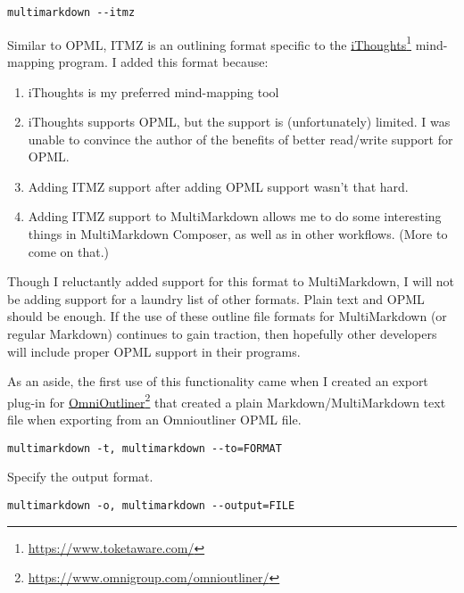 \begin{verbatim}
multimarkdown --itmz
\end{verbatim}

Similar to OPML, ITMZ is an outlining format specific to the \href{https://www.toketaware.com/}{iThoughts}\footnote{\href{https://www.toketaware.com/}{https:\slash{}\slash{}www.toketaware.com\slash{}}} mind-mapping program. I added this format because:

\begin{enumerate}
\item iThoughts is my preferred mind-mapping tool

\item iThoughts supports OPML, but the support is (unfortunately) limited. I was unable to convince the author of the benefits of better read\slash{}write support for OPML.

\item Adding ITMZ support after adding OPML support wasn't that hard.

\item Adding ITMZ support to MultiMarkdown allows me to do some interesting things in MultiMarkdown Composer, as well as in other workflows. (More to come on that.)

\end{enumerate}

Though I reluctantly added support for this format to MultiMarkdown, I will not be adding support for a laundry list of other formats. Plain text and OPML should be enough. If the use of these outline file formats for MultiMarkdown (or regular Markdown) continues to gain traction, then hopefully other developers will include proper OPML support in their programs.

As an aside, the first use of this functionality came when I created an export plug-in for \href{https://www.omnigroup.com/omnioutliner/}{OmniOutliner}\footnote{\href{https://www.omnigroup.com/omnioutliner/}{https:\slash{}\slash{}www.omnigroup.com\slash{}omnioutliner\slash{}}} that created a plain Markdown\slash{}MultiMarkdown text file when exporting from an Omnioutliner OPML file.

\begin{verbatim}
multimarkdown -t, multimarkdown --to=FORMAT
\end{verbatim}

Specify the output format.

\begin{verbatim}
multimarkdown -o, multimarkdown --output=FILE
\end{verbatim}

